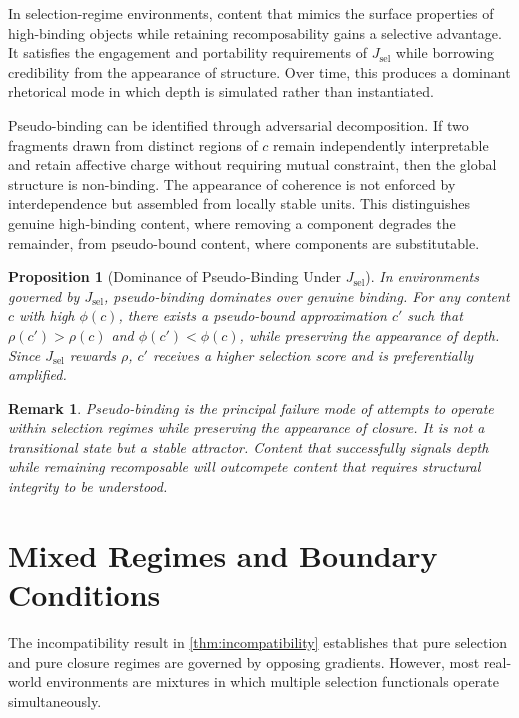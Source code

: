 \documentclass[12pt]{article}
\newtheorem{proposition}{Proposition}[section]
\newtheorem{remark}{Remark}[section]
\newcommand{\bind}{\phi}
\newcommand{\recomp}{\rho}
\newcommand{\Jsel}{J_{\mathrm{sel}}}
\begin{document}
In selection-regime environments, content that mimics the surface
properties of high-binding objects while retaining recomposability gains
a selective advantage. It satisfies the engagement and portability
requirements of $\Jsel$ while borrowing credibility from the appearance
of structure. Over time, this produces a dominant rhetorical mode in
which depth is simulated rather than instantiated.

Pseudo-binding can be identified through adversarial decomposition. If
two fragments drawn from distinct regions of $c$ remain independently
interpretable and retain affective charge without requiring mutual
constraint, then the global structure is non-binding. The appearance of
coherence is not enforced by interdependence but assembled from locally
stable units. This distinguishes genuine high-binding content, where
removing a component degrades the remainder, from pseudo-bound content,
where components are substitutable.

\begin{proposition}[Dominance of Pseudo-Binding Under $\Jsel$]
\label{prop:pseudodominance}
In environments governed by $\Jsel$, pseudo-binding dominates over
genuine binding. For any content $c$ with high $\bind(c)$, there exists
a pseudo-bound approximation $c'$ such that $\recomp(c') > \recomp(c)$
and $\bind(c') < \bind(c)$, while preserving the appearance of depth.
Since $\Jsel$ rewards $\recomp$, $c'$ receives a higher selection score
and is preferentially amplified.
\end{proposition}

\begin{remark}
Pseudo-binding is the principal failure mode of attempts to operate
within selection regimes while preserving the appearance of closure. It
is not a transitional state but a stable attractor. Content that
successfully signals depth while remaining recomposable will outcompete
content that requires structural integrity to be understood.
\end{remark}

\section{Mixed Regimes and Boundary Conditions}
\label{sec:mixed}

The incompatibility result in \cref{thm:incompatibility} establishes
that pure selection and pure closure regimes are governed by opposing
gradients. However, most real-world environments are mixtures in which
multiple selection functionals operate simultaneously.
\end{document}
